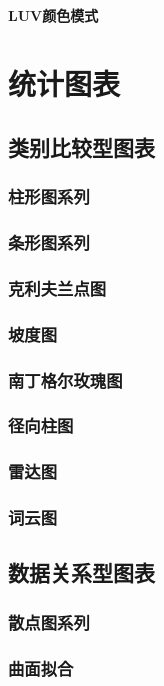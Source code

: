 \documentclass[openany]{progbookcn}
\begin{document}
\subsubsection{LUV颜色模式}

\chapter{统计图表}
\section{类别比较型图表}
\subsection{柱形图系列}
\subsection{条形图系列}
\subsection{克利夫兰点图}
\subsection{坡度图}
\subsection{南丁格尔玫瑰图}
\subsection{径向柱图}
\subsection{雷达图}
\subsection{词云图}

\section{数据关系型图表}
\subsection{散点图系列}
\subsection{曲面拟合}
\end{document}
